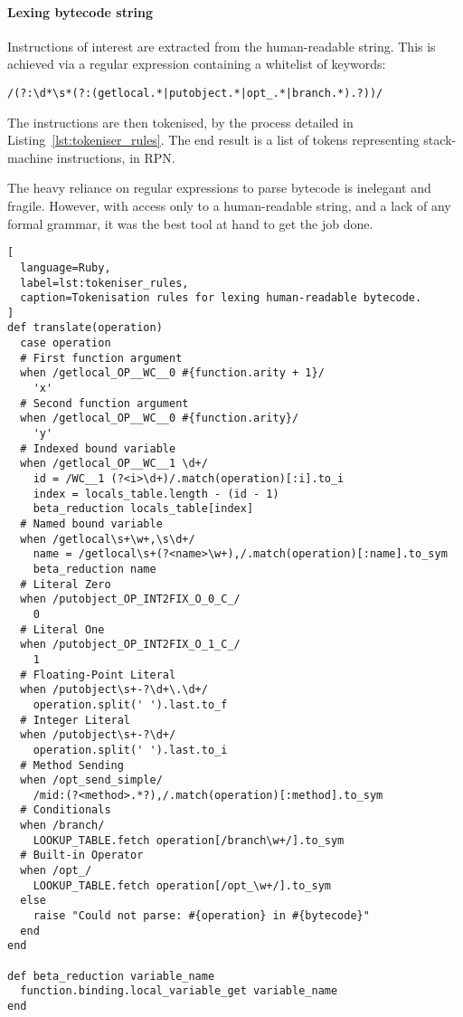 \paragraph*{Lexing bytecode string}
Instructions of interest are extracted from the human-readable string. This is achieved via a regular expression containing a whitelist of keywords:
\begin{verbatim}
/(?:\d*\s*(?:(getlocal.*|putobject.*|opt_.*|branch.*).?))/
\end{verbatim}

The instructions are then tokenised, by the process detailed in Listing~\ref{lst:tokeniser_rules}.
The end result is a list of tokens representing stack-machine instructions, in \ac{RPN}.

The heavy reliance on regular expressions to parse bytecode is inelegant and fragile.
However, with access only to a human-readable string, and a lack of any formal grammar, it was the best tool at hand to get the job done.

\begin{lstlisting}[
  language=Ruby,
  label=lst:tokeniser_rules,
  caption=Tokenisation rules for lexing human-readable bytecode.
]
def translate(operation)
  case operation
  # First function argument
  when /getlocal_OP__WC__0 #{function.arity + 1}/
    'x'
  # Second function argument
  when /getlocal_OP__WC__0 #{function.arity}/
    'y'
  # Indexed bound variable
  when /getlocal_OP__WC__1 \d+/
    id = /WC__1 (?<i>\d+)/.match(operation)[:i].to_i
    index = locals_table.length - (id - 1)
    beta_reduction locals_table[index]
  # Named bound variable
  when /getlocal\s+\w+,\s\d+/
    name = /getlocal\s+(?<name>\w+),/.match(operation)[:name].to_sym
    beta_reduction name
  # Literal Zero
  when /putobject_OP_INT2FIX_O_0_C_/
    0
  # Literal One
  when /putobject_OP_INT2FIX_O_1_C_/
    1
  # Floating-Point Literal
  when /putobject\s+-?\d+\.\d+/
    operation.split(' ').last.to_f
  # Integer Literal
  when /putobject\s+-?\d+/
    operation.split(' ').last.to_i
  # Method Sending
  when /opt_send_simple/
    /mid:(?<method>.*?),/.match(operation)[:method].to_sym
  # Conditionals
  when /branch/
    LOOKUP_TABLE.fetch operation[/branch\w+/].to_sym
  # Built-in Operator
  when /opt_/
    LOOKUP_TABLE.fetch operation[/opt_\w+/].to_sym
  else
    raise "Could not parse: #{operation} in #{bytecode}"
  end
end

def beta_reduction variable_name
  function.binding.local_variable_get variable_name
end
\end{lstlisting}

